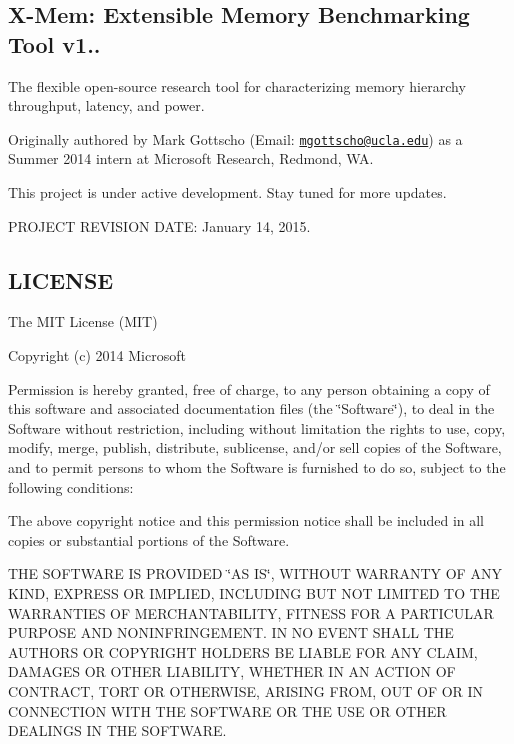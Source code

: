 \subsection*{X-\/\-Mem\-: Extensible Memory Benchmarking Tool v1.. }

The flexible open-\/source research tool for characterizing memory hierarchy throughput, latency, and power.

Originally authored by Mark Gottscho (Email\-: \href{mailto:mgottscho@ucla.edu}{\tt mgottscho@ucla.\-edu}) as a Summer 2014 intern at Microsoft Research, Redmond, W\-A.

This project is under active development. Stay tuned for more updates.

P\-R\-O\-J\-E\-C\-T R\-E\-V\-I\-S\-I\-O\-N D\-A\-T\-E\-: January 14, 2015. 

 \subsection*{L\-I\-C\-E\-N\-S\-E }

The M\-I\-T License (M\-I\-T)

Copyright (c) 2014 Microsoft

Permission is hereby granted, free of charge, to any person obtaining a copy of this software and associated documentation files (the \char`\"{}\-Software\char`\"{}), to deal in the Software without restriction, including without limitation the rights to use, copy, modify, merge, publish, distribute, sublicense, and/or sell copies of the Software, and to permit persons to whom the Software is furnished to do so, subject to the following conditions\-:

The above copyright notice and this permission notice shall be included in all copies or substantial portions of the Software.

T\-H\-E S\-O\-F\-T\-W\-A\-R\-E I\-S P\-R\-O\-V\-I\-D\-E\-D \char`\"{}\-A\-S I\-S\char`\"{}, W\-I\-T\-H\-O\-U\-T W\-A\-R\-R\-A\-N\-T\-Y O\-F A\-N\-Y K\-I\-N\-D, E\-X\-P\-R\-E\-S\-S O\-R I\-M\-P\-L\-I\-E\-D, I\-N\-C\-L\-U\-D\-I\-N\-G B\-U\-T N\-O\-T L\-I\-M\-I\-T\-E\-D T\-O T\-H\-E W\-A\-R\-R\-A\-N\-T\-I\-E\-S O\-F M\-E\-R\-C\-H\-A\-N\-T\-A\-B\-I\-L\-I\-T\-Y, F\-I\-T\-N\-E\-S\-S F\-O\-R A P\-A\-R\-T\-I\-C\-U\-L\-A\-R P\-U\-R\-P\-O\-S\-E A\-N\-D N\-O\-N\-I\-N\-F\-R\-I\-N\-G\-E\-M\-E\-N\-T. I\-N N\-O E\-V\-E\-N\-T S\-H\-A\-L\-L T\-H\-E A\-U\-T\-H\-O\-R\-S O\-R C\-O\-P\-Y\-R\-I\-G\-H\-T H\-O\-L\-D\-E\-R\-S B\-E L\-I\-A\-B\-L\-E F\-O\-R A\-N\-Y C\-L\-A\-I\-M, D\-A\-M\-A\-G\-E\-S O\-R O\-T\-H\-E\-R L\-I\-A\-B\-I\-L\-I\-T\-Y, W\-H\-E\-T\-H\-E\-R I\-N A\-N A\-C\-T\-I\-O\-N O\-F C\-O\-N\-T\-R\-A\-C\-T, T\-O\-R\-T O\-R O\-T\-H\-E\-R\-W\-I\-S\-E, A\-R\-I\-S\-I\-N\-G F\-R\-O\-M, O\-U\-T O\-F O\-R I\-N C\-O\-N\-N\-E\-C\-T\-I\-O\-N W\-I\-T\-H T\-H\-E S\-O\-F\-T\-W\-A\-R\-E O\-R T\-H\-E U\-S\-E O\-R O\-T\-H\-E\-R D\-E\-A\-L\-I\-N\-G\-S I\-N T\-H\-E S\-O\-F\-T\-W\-A\-R\-E. 

